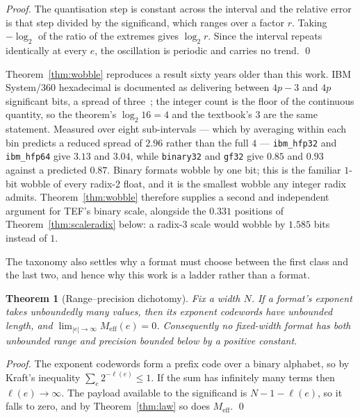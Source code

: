 \documentclass[11pt]{article}
\newtheorem{theorem}{Theorem}
\theoremstyle{definition}
\begin{document}
\begin{proof}
The quantisation step is constant across the interval and the relative error is
that step divided by the significand, which ranges over a factor $r$. Taking
$-\log_2$ of the ratio of the extremes gives $\log_2 r$. Since the interval
repeats identically at every $e$, the oscillation is periodic and carries no
trend. \qed
\end{proof}

Theorem~\ref{thm:wobble} reproduces a result sixty years older than this work.
IBM System/360 hexadecimal is documented as delivering between $4p-3$ and $4p$
significant bits, a spread of three~\cite{goldberg1991,ibmhfp}; the integer count
is the floor of the continuous quantity, so the theorem's $\log_2 16 = 4$ and the
textbook's $3$ are the same statement. Measured over eight sub-intervals ---
which by averaging within each bin predicts a reduced spread of $2.96$ rather than
the full $4$ --- \texttt{ibm\_hfp32} and \texttt{ibm\_hfp64} give $3.13$ and
$3.04$, while \texttt{binary32} and \texttt{gf32} give $0.85$ and $0.93$ against a
predicted $0.87$. Binary formats wobble by one bit; this is the familiar
$1$-bit wobble of every radix-2 float, and it is the smallest wobble any integer
radix admits. Theorem~\ref{thm:wobble} therefore supplies a second and independent
argument for TEF's binary scale, alongside the $0.331$ positions of
Theorem~\ref{thm:scaleradix} below: a radix-3 scale would wobble by $1.585$ bits
instead of $1$.

The taxonomy also settles why a format must choose between the first class and the
last two, and hence why this work is a ladder rather than a format.

\begin{theorem}[Range--precision dichotomy]
\label{thm:dichotomy}
Fix a width $N$. If a format's exponent takes unboundedly many values, then its
exponent codewords have unbounded length, and
$\lim_{|e| \to \infty} M_{\mathrm{eff}}(e) = 0$. Consequently no fixed-width
format has both unbounded range and precision bounded below by a positive
constant.
\end{theorem}

\begin{proof}
The exponent codewords form a prefix code over a binary alphabet, so by Kraft's
inequality $\sum_{e} 2^{-\ell(e)} \leq 1$. If the sum has infinitely many terms
then $\ell(e) \to \infty$. The payload available to the significand is
$N - 1 - \ell(e)$, so it falls to zero, and by Theorem~\ref{thm:law} so does
$M_{\mathrm{eff}}$. \qed
\end{proof}
\end{document}
